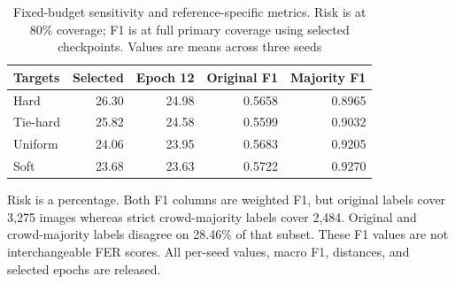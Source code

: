 \begin{table}[t]
\caption{Fixed-budget sensitivity and reference-specific metrics. Risk is at 80\% coverage; F1 is at full primary coverage using selected checkpoints. Values are means across three seeds}\label{tab:sensitivity}
\centering\begin{tabular}{lrrrr}\toprule
Targets & Selected & Epoch 12 & Original F1 & Majority F1\\\midrule
Hard & 26.30 & 24.98 & 0.5658 & 0.8965\\
Tie-hard & 25.82 & 24.58 & 0.5599 & 0.9032\\
Uniform & 24.06 & 23.95 & 0.5683 & 0.9205\\
Soft & 23.68 & 23.63 & 0.5722 & 0.9270\\
\bottomrule\end{tabular}
\smallskip\par\footnotesize Risk is a percentage. Both F1 columns are weighted F1, but original labels cover 3,275 images whereas strict crowd-majority labels cover 2,484. Original and crowd-majority labels disagree on 28.46\% of that subset. These F1 values are not interchangeable FER scores. All per-seed values, macro F1, distances, and selected epochs are released.
\end{table}
